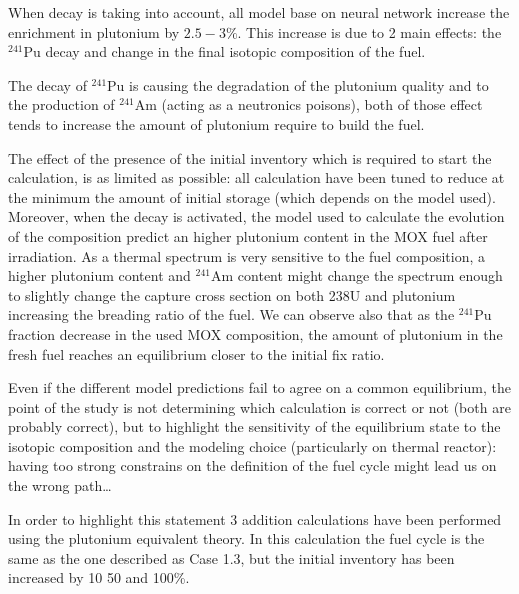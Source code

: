 \documentclass[10pt]{article}
\begin{document}
When decay is taking into account, all model base on neural network increase the
enrichment in plutonium by $2.5-3\%$. This increase is due to 2 main effects: the
$^{241}$Pu decay and change in the final isotopic composition of the fuel.

The decay of $^{241}$Pu is causing the degradation of the plutonium quality and to
the production of $^{241}$Am (acting as a neutronics poisons), both of those effect
tends to increase the amount of plutonium require to build the fuel.

The effect of the presence of the initial inventory which is required to start
the calculation, is as limited as possible: all calculation have been tuned to
reduce at the minimum the amount of initial storage (which depends on the model
used).
Moreover, when the decay is activated, the model used to calculate the evolution
of the composition predict an higher plutonium content in the MOX fuel after
irradiation. As a thermal spectrum is very sensitive to the fuel composition, a
higher plutonium content and $^{241}$Am content might change the spectrum enough to
slightly change the capture cross section on both 238U and plutonium increasing
the breading ratio of the fuel. 
We can observe also that as the $^{241}$Pu fraction decrease in the used MOX
composition, the amount of plutonium in the fresh fuel reaches an equilibrium
closer to the initial fix ratio.


Even if the different model predictions fail to agree on a common equilibrium,
the point of the study is not determining which calculation is correct or not
(both are probably correct), but to highlight the sensitivity of the equilibrium
state to the isotopic composition and the modeling choice (particularly on
thermal reactor): having too strong constrains on the definition of the fuel
cycle might lead us on the wrong path\dots


In order to highlight this statement 3 addition calculations have been performed
using the plutonium equivalent theory.  In this calculation the fuel cycle is
the same as the one described as Case 1.3, but the initial inventory has been
increased by 10 50 and 100\%.








\end{document}
